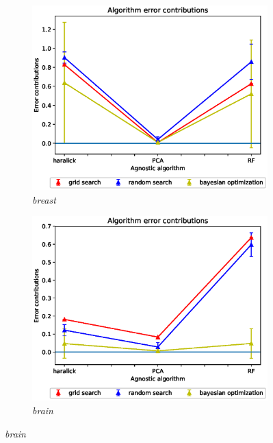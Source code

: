 \begin{figure}[ht!]
\centering
\begin{subfigure}{.5\textwidth}
  \centering
  \includegraphics[scale=0.37]{img/EP/agnostic_error_alg_breast.eps}
  \caption{\textit{breast}}
  \label{fig:sfig1}
\end{subfigure}%
\begin{subfigure}{.5\textwidth}
  \centering
  \includegraphics[scale=0.37]{img/EP/agnostic_error_alg_brain.eps}
  \caption{\textit{brain}}
  \label{fig:sfig2}
\end{subfigure}

\end{figure}
